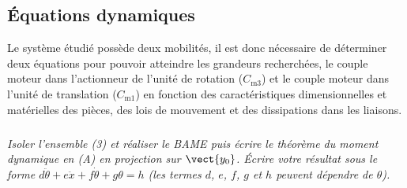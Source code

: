 \subsection{Équations dynamiques}

\ifprof
\else
Le système étudié possède deux mobilités, il est donc nécessaire de déterminer deux équations pour
pouvoir atteindre les grandeurs recherchées, le couple moteur dans l’actionneur de l’unité de rotation
($C_{\text{m3}}$) et le couple moteur dans l’unité de translation ($C_{\text{m1}}$) en fonction des caractéristiques
dimensionnelles et matérielles des pièces, des lois de mouvement et des dissipations dans les liaisons.
\fi


\subparagraph{\label{q_04}}\textit{Isoler l’ensemble (3) et réaliser le BAME puis écrire le théorème du moment dynamique en (A) en projection sur $\vect{y_0}$. Écrire votre résultat sous le forme $d\ddot{\theta}+e\ddot{x}+f\dot{\theta}+g\theta = h $ (les termes $d$, $e$, $f$, $g$ et $h$ peuvent dépendre de $\theta$).}
\ifprof
